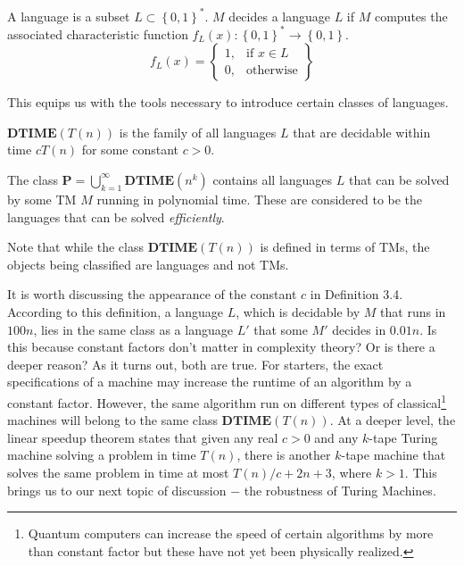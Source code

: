 \documentclass[usletter]{article}
\begin{document}
\begin{definition}
    A language is a subset \(L \subset \left\{ 0,1 \right\}^*\). \(M\) decides a language \(L\) if \(M\) computes the associated characteristic function \(f_L(x): \left\{ 0,1 \right\}^* \to \left\{ 0,1 \right\}\).
    \begin{equation}
        f_L(x) = 
        \left\{
            \begin{array}{lr}
                1, & \text{if } x \in L\\
                0, & \text{otherwise}
            \end{array}
        \right\}
    \end{equation}
\end{definition}

This equips us with the tools necessary to introduce certain classes of languages.

\begin{definition}
    \(\mathbf{DTIME}(T(n))\) is the family of all languages \(L\) that are decidable within time \(cT(n)\) for some constant \(c > 0\). 
\end{definition}

\begin{definition}
    The class \(\mathbf{P} = \bigcup\limits_{k = 1}^{\infty}\mathbf{DTIME}(n^k)\) contains all languages \(L\) that can be solved by some TM \(M\) running in polynomial time. 
    These are considered to be the languages that can be solved \textit{efficiently}.
\end{definition}

\begin{remark}
    Note that while the class \(\mathbf{DTIME}(T(n))\) is defined in terms of TMs, 
the objects being classified are languages and not TMs.
\end{remark}

It is worth discussing the appearance of the constant \(c\) in Definition 3.4.
According to this definition, a language \(L\), which is decidable by \(M\) that runs in \(100n\), lies in the same class as a language \(L'\) 
that some \(M'\) decides in \(0.01n\). Is this because constant factors don't matter in complexity theory? Or is there a deeper reason? As it turns out, 
both are true. For starters, the exact specifications of a machine may increase the runtime of an algorithm by a constant factor. However, the same algorithm 
run on different types of classical\footnote[1]{Quantum computers can increase the speed of certain algorithms by more than constant factor but these have not yet been physically realized.} 
machines will belong to the same class \(\mathbf{DTIME}(T(n))\). At a deeper level, the linear speedup theorem \cite{textbook} states that given any real \(c > 0\) and any \(k\)-tape Turing machine solving a problem
in time \(T(n)\), there is another \(k\)-tape machine that solves the same problem in time at most \(T(n)/c + 2n + 3\), where \(k > 1\). This brings us to our next topic of discussion \(-\) the robustness of Turing Machines. 
 
\end{document}
